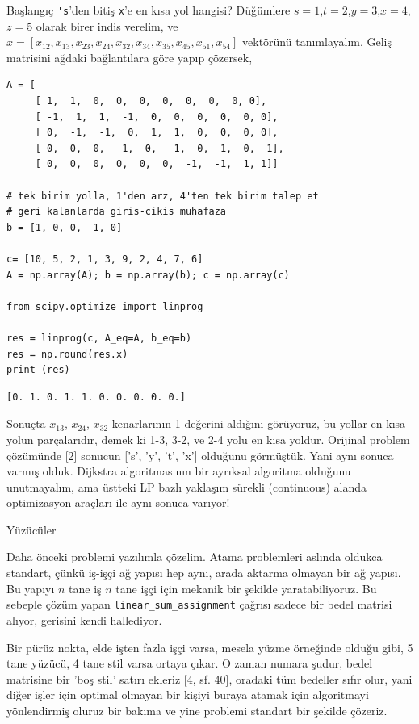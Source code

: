 \documentclass[12pt,fleqn]{article}\usepackage{../../common}
\begin{document}
Başlangıç \verb!'s!'den bitiş \verb!x!'e en kısa yol hangisi?  Düğümlere
$s=1$,$t=2$,$y=3$,$x=4$,$z=5$ olarak birer indis verelim, ve
$x = [x_{12}, x_{13}, x_{23}, x_{24}, x_{32}, x_{34}, x_{35}, x_{45},
x_{51}, x_{54}]$ vektörünü tanımlayalım. Geliş matrisini ağdaki
bağlantılara göre yapıp çözersek,

\begin{verbatim}
A = [
     [ 1,  1,  0,  0,  0,  0,  0,  0,  0, 0],
     [ -1,  1,  1,  -1,  0,  0,  0,  0,  0, 0],
     [ 0,  -1,  -1,  0,  1,  1,  0,  0,  0, 0],
     [ 0,  0,  0,  -1,  0,  -1,  0,  1,  0, -1],
     [ 0,  0,  0,  0,  0,  0,  -1,  -1,  1, 1]]

# tek birim yolla, 1'den arz, 4'ten tek birim talep et
# geri kalanlarda giris-cikis muhafaza
b = [1, 0, 0, -1, 0]

c= [10, 5, 2, 1, 3, 9, 2, 4, 7, 6]
A = np.array(A); b = np.array(b); c = np.array(c)

from scipy.optimize import linprog

res = linprog(c, A_eq=A, b_eq=b)
res = np.round(res.x)
print (res)
\end{verbatim}

\begin{verbatim}
[0. 1. 0. 1. 1. 0. 0. 0. 0. 0.]
\end{verbatim}

Sonuçta $x_{13}$, $x_{24}$, $x_{32}$ kenarlarının 1 değerini aldığını
görüyoruz, bu yollar en kısa yolun parçalarıdır, demek ki 1-3, 3-2, ve 2-4
yolu en kısa yoldur. Orijinal problem çözümünde [2] sonucun ['s', 'y', 't',
'x'] olduğunu görmüştük. Yani aynı sonuca varmış olduk. Dijkstra
algoritmasının bir ayrıksal algoritma olduğunu unutmayalım, ama üstteki LP
bazlı yaklaşım sürekli (continuous) alanda optimizasyon araçları ile aynı
sonuca varıyor!

Yüzücüler

Daha önceki problemi yazılımla çözelim. Atama problemleri aslında oldukca
standart, çünkü iş-işçi ağ yapısı hep aynı, arada aktarma olmayan bir
ağ yapısı. Bu yapıyı $n$ tane iş $n$ tane işçi için mekanik bir şekilde
yaratabiliyoruz. Bu sebeple çözüm yapan \verb!linear_sum_assignment!
çağrısı sadece bir bedel matrisi alıyor, gerisini kendi hallediyor. 

Bir pürüz nokta, elde işten fazla işçi varsa, mesela yüzme örneğinde olduğu
gibi, 5 tane yüzücü, 4 tane stil varsa ortaya çıkar. O zaman numara şudur,
bedel matrisine bir 'boş stil' satırı ekleriz [4, sf. 40], oradaki tüm
bedeller sıfır olur, yani diğer işler için optimal olmayan bir kişiyi
buraya atamak için algoritmayi yönlendirmiş oluruz bir bakıma ve yine
problemi standart bir şekilde çözeriz.
\end{document}
